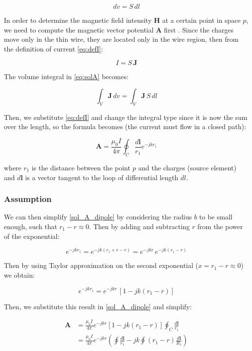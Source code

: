 \begin{equation}
    dv = S \, dl
    \label{eq:dvolume}
\end{equation}

In order to determine the magnetic field intensity 
\(\mathbf{H}\) at a certain point in space \( p \), 
we need to compute the magnetic vector potential 
\(\mathbf{A}\) first \cite{book-magnetism}. Since the 
charges move only in the thin wire, they are located 
only in the wire region, then from the definition of 
current \ref{eq:defI}:

\[
    I = S \, \mathbf{J}
\]

The volume integral in \ref{eq:solA} becomes:

\[
    \int_V \mathbf{J} \, dv =  \int_V \mathbf{J} \, S \, dl
\]

Then, we substitute \ref{eq:defI} and change the 
integral type since it is now the sum over the length, 
so the formula becomes (the current must flow in a 
closed path):

\begin{equation}
    \mathbf{A} = \frac{\mu_0 I}{4\pi} \oint_C 
    \frac{d\mathbf{l}}{r_1} e^{-j k r_1}
    \label{sol_A_dipole}
\end{equation}

where $r_1$ is the distance between the point $p$ and 
the charges (source element) and $d\mathbf{l}$ is a 
vector tangent to the loop of differential length $dl$.

\subsubsection{Assumption} \label{Assumption}

We can then simplify \ref{sol_A_dipole} by considering 
the radius $b$ to be small enough, such that 
$r_1 - r \approx 0$. Then by adding and subtracting $r$ 
from the power of the exponential:

\[
    e^{-j k r_1} = e^{-j k (r_1 + r - r)} = 
    e^{-j k r} \, e^{-j k (r_1 - r)}
\]

Then by using Taylor approximation on the second 
exponential ($ x = r_1 - r \approx 0$) we obtain:

\[
    e^{-j k r_1} = e^{-j k r}\, \left[ 1 - j k (r_1 - r) \right]
\]

Then, we substitute this result in \ref{sol_A_dipole} 
and simplify:

\[
\begin{aligned}
    \mathbf{A} &= \frac{\mu_0 I}{4 \pi} e^{-j k r} 
    \left[ 1 - j k (r_1 - r) \right] \oint_C 
    \frac{d\mathbf{l}}{r_1} \\
    &= \frac{\mu_0 I}{4 \pi} e^{-j k r} \left( 
    \oint \frac{d\mathbf{l}}{r_1} - j k \oint 
    (r_1 - r) \frac{d\mathbf{l}}{R_1} \right)
\end{aligned}
\]

